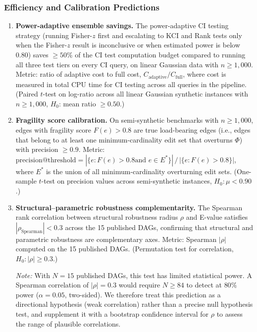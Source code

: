 \documentclass[11pt,a4paper]{article}
\theoremstyle{definition}
\theoremstyle{remark}
\newcommand{\fragility}{F}
\newcommand{\radius}{\rho}
\newcommand{\Phi}{\varPhi}
\begin{document}
\subsubsection{Efficiency and Calibration Predictions}

\begin{enumerate}[label=\textbf{P\arabic*:},resume]
\item \textbf{Power-adaptive ensemble savings.} The power-adaptive CI
  testing strategy (running Fisher-$z$ first and escalating to KCI
  and Rank tests only when the Fisher-$z$ result is inconclusive or
  when estimated power is below $0.80$) saves $\geq 50\%$ of the CI
  test computation budget compared to running all three test tiers on
  every CI query, on linear Gaussian data with $n \geq 1{,}000$.
  Metric: ratio of adaptive cost to full cost,
  $C_{\mathrm{adaptive}} / C_{\mathrm{full}}$, where cost is measured
  in total CPU time for CI testing across all queries in the pipeline.
  (Paired $t$-test on log-ratio across all linear Gaussian synthetic
  instances with $n \geq 1{,}000$, $H_0$: mean ratio $\geq 0.50$.)

\item \textbf{Fragility score calibration.} On semi-synthetic
  benchmarks with $n \geq 1{,}000$, edges with fragility score
  $\fragility(e) > 0.8$ are true load-bearing edges (i.e., edges
  that belong to at least one minimum-cardinality edit set that
  overturns $\Phi$) with precision $\geq 0.9$. Metric:
  $\mathrm{precision@threshold} = |\{e : \fragility(e) > 0.8 \text{
  and } e \in E^*\}| \,/\, |\{e : \fragility(e) > 0.8\}|$, where
  $E^*$ is the union of all minimum-cardinality overturning edit
  sets. (One-sample $t$-test on precision values across semi-synthetic
  instances, $H_0: \mu < 0.90$.)

\item \textbf{Structural--parametric robustness complementarity.}
  The Spearman rank correlation between structural robustness radius
  $\radius$ and E-value \cite{vanderweele2017} satisfies
  $|\rho_{\mathrm{Spearman}}| < 0.3$ across the 15 published DAGs,
  confirming that structural and parametric robustness are complementary
  axes. Metric: Spearman $|\rho|$ computed on the 15 published DAGs.
  (Permutation test for correlation, $H_0: |\rho| \geq 0.3$.)

  \emph{Note:} With $N = 15$ published DAGs, this test has limited
  statistical power. A Spearman correlation of $|\rho| = 0.3$ would
  require $N \geq 84$ to detect at $80\%$ power ($\alpha = 0.05$,
  two-sided). We therefore treat this prediction as a directional
  hypothesis (weak correlation) rather than a precise null hypothesis
  test, and supplement it with a bootstrap confidence interval for
  $\rho$ to assess the range of plausible correlations.
\end{enumerate}
\end{document}
